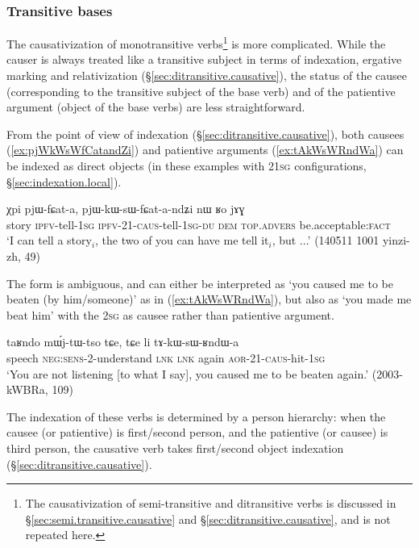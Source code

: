 \subsubsection{Transitive bases} \label{sec:sig.caus.tr}
The causativization of monotransitive verbs\footnote{The causativization of semi-transitive and ditransitive verbs is discussed in §\ref{sec:semi.transitive.causative} and §\ref{sec:ditransitive.causative}, and is not repeated here. } is more complicated. While the causer is always treated like a transitive subject in terms of indexation, ergative marking and relativization (§\ref{sec:ditransitive.causative}), the status of the causee (corresponding to the transitive subject of the base verb) and of the patientive argument (object of the base verbs) are less straightforward.

From the point of view of indexation (§\ref{sec:ditransitive.causative}), both causees (\ref{ex:pjWkWsWfCatandZi}) and patientive arguments (\ref{ex:tAkWsWRndWa}) can be indexed as direct objects (in these examples with 2\fl{}\textsc{1sg} configurations, §\ref{sec:indexation.local}).  
 
\begin{exe}
\ex \label{ex:pjWkWsWfCatandZi}
\gll  χpi pjɯ-fɕat-a, pjɯ-kɯ-sɯ-fɕat-a-ndʑi nɯ ʁo jɤɣ \\
story \textsc{ipfv}-tell-\textsc{1sg} \textsc{ipfv}-2\fl{}1-\textsc{caus}-tell-\textsc{1sg}-\textsc{du} \textsc{dem} \textsc{top}.\textsc{advers} be.acceptable:\textsc{fact} \\
\glt `I can tell a story$_i$, the two of you can have me tell it$_i$, but ...' (140511 1001 yinzi-zh, 49)
\end{exe}

The form  is ambiguous, and can either be interpreted as `you caused me to be beaten (by him/someone)' as in (\ref{ex:tAkWsWRndWa}), but also as `you made me beat him' with the \textsc{2sg} as causee rather than patientive argument.
 
\begin{exe}
\ex \label{ex:tAkWsWRndWa}
\gll taʁndo mɯ́j-tɯ-tso tɕe, tɕe li tɤ-kɯ-sɯ-ʁndɯ-a \\
speech \textsc{neg}:\textsc{sens}-2-understand \textsc{lnk} \textsc{lnk} again \textsc{aor}-2\fl{}1-\textsc{caus}-hit-\textsc{1sg} \\
\glt `You are not listening [to what I say], you caused me to be beaten again.' (2003-kWBRa, 109)
\end{exe}

The indexation of these verbs is determined by a person hierarchy: when the causee (or patientive) is first/second person, and the patientive (or causee)  is third person, the causative verb takes first/second object indexation (§\ref{sec:ditransitive.causative}).

